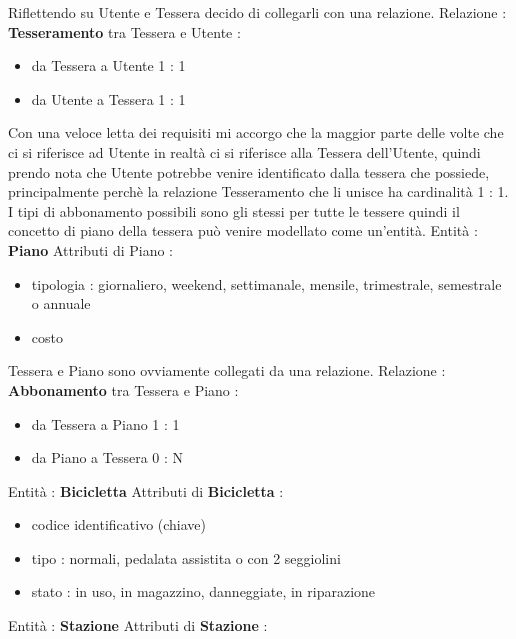\documentclass[a4paper,twoside]{article}
\begin{document}
Riflettendo su Utente e Tessera decido di collegarli con una relazione.\newline
Relazione : \textbf{Tesseramento} tra Tessera e Utente :
\begin{itemize}
 \item da Tessera a Utente 1 : 1
 \item da Utente a Tessera 1 : 1
\end{itemize}
Con una veloce letta dei requisiti mi accorgo che la maggior parte delle volte che ci si riferisce ad Utente in realtà ci si riferisce alla Tessera dell'Utente, quindi prendo nota che Utente potrebbe venire identificato dalla tessera che possiede, principalmente perchè la relazione Tesseramento che li unisce ha cardinalità 1 : 1.\newline
I tipi di abbonamento possibili sono gli stessi per tutte le tessere quindi il concetto di piano della tessera può venire modellato come un'entità.\newline
Entità : \textbf{Piano}\newline
Attributi di Piano :
\begin{itemize}
 \item tipologia : giornaliero, weekend, settimanale, mensile, trimestrale, semestrale o annuale
 \item costo
\end{itemize}
Tessera e Piano sono ovviamente collegati da una relazione.\newline
Relazione : \textbf{Abbonamento} tra Tessera e Piano :
\begin{itemize}
 \item da Tessera a Piano 1 : 1
 \item da Piano a Tessera 0 : N
\end{itemize}
Entità : \textbf{Bicicletta}\newline
Attributi di \textbf{Bicicletta} :
\begin{itemize}
 \item codice identificativo (chiave)
 \item tipo : normali, pedalata assistita o con 2 seggiolini
 \item stato : in uso, in magazzino, danneggiate, in riparazione
\end{itemize}
Entità : \textbf{Stazione}\newline
Attributi di \textbf{Stazione} :
\end{document}
